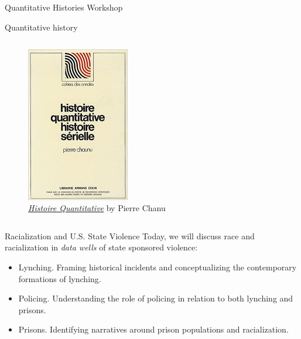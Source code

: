 \documentclass[
  ignorenonframetext,
]{beamer}
\providecommand{\tightlist}{%
  \setlength{\itemsep}{0pt}\setlength{\parskip}{0pt}}
\begin{document}
\begin{frame}[fragile]{Quantitative Histories Workshop}
\begin{block}{Quantitative history}
\begin{columns}[T]
\begin{column}{0.6\textwidth}
\begin{figure}
\centering
\includegraphics[width=0.4\textwidth,height=\textheight]{quanthist.jpg}
\caption{\href{https://www.jstor.org/stable/1876930}{\emph{Histoire
Quantitative}} by Pierre Chanu}
\end{figure}
\end{column}
\end{columns}
\end{block}

\begin{block}{Racialization and U.S. State Violence}
\protect\hypertarget{racialization-and-u.s.-state-violence}{}
Today, we will discuss race and racialization in \emph{data wells} of
state sponsored violence:

\pause

\begin{itemize}
\tightlist
\item
  Lynching. Framing historical incidents and conceptualizing the
  contemporary formations of lynching.
\end{itemize}

\pause

\begin{itemize}
\tightlist
\item
  Policing. Understanding the role of policing in relation to both
  lynching and prisons.
\end{itemize}

\pause

\begin{itemize}
\tightlist
\item
  Prisons. Identifying narratives around prison populations and
  racialization.
\end{itemize}
\end{block}


\end{frame}
\end{document}
